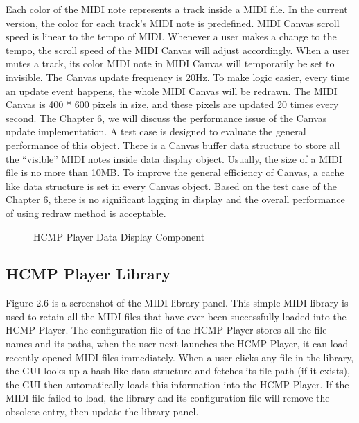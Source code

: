 Each color of the MIDI note represents a track inside 
a MIDI file. In the current version, the color for each track's MIDI note is 
predefined. MIDI Canvas scroll speed is linear to the tempo of MIDI. Whenever 
a user makes a change to the tempo, the scroll speed of the MIDI Canvas will adjust
accordingly. When a user mutes a
track, its color MIDI note in MIDI Canvas will temporarily be set to invisible. 
The Canvas
update frequency is 20Hz. To make logic easier, every time an update event 
happens, the whole MIDI Canvas will be redrawn. The MIDI Canvas is 400 * 600 pixels
in size, and these pixels are updated 20 times every second. The Chapter 6, we will
discuss the performance issue of the Canvas update implementation. A test case is
designed to evaluate the general performance of this object. There is a Canvas 
buffer data structure to store all the ``visible'' MIDI notes inside data 
display object. Usually, the size of a MIDI file is no more than 10MB. To improve
the general efficiency of Canvas, a cache like data structure is set in 
every Canvas object. Based on the test case of the Chapter 6, there is no
significant lagging in display and the overall performance of using redraw 
method is acceptable.

\begin{figure}[H]
\caption{HCMP Player Data Display Component}
\end{figure}

\subsection{HCMP Player Library}

Figure 2.6 is a screenshot of the MIDI library panel. This simple MIDI library is 
used to retain all the MIDI files that have ever been successfully loaded into 
the HCMP Player. 
The configuration file of the HCMP Player stores all the file names and its paths, 
when the user next launches the HCMP Player, it can load
recently opened MIDI files immediately. When a user clicks any file in the library, 
the GUI looks up a hash-like data structure and fetches its file path 
(if it exists), the GUI then automatically
loads this information into the HCMP Player. If the MIDI file failed to load, 
the library and its configuration file will remove the obsolete entry, then 
update the library panel.


